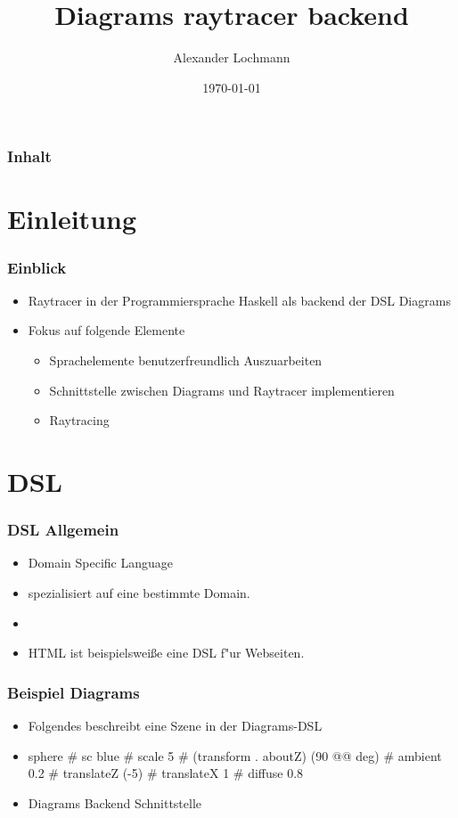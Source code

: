 \documentclass[12pt,german]{beamer}
\title{Diagrams raytracer backend}
\author{Alexander Lochmann}
\date{\today}
\begin{document}
\begin{frame}
\titlepage
\end{frame}

\begin{frame}
\frametitle{Inhalt}
\setcounter{tocdepth}{1}
\tableofcontents
\end{frame}

\section{Einleitung}

\begin{frame}
\frametitle{Einblick}
	\begin{itemize}
		\item Raytracer in der Programmiersprache Haskell
		      als backend der DSL Diagrams
		\pause
		\item Fokus auf folgende Elemente
                \begin{itemize}
                      \item Sprachelemente benutzerfreundlich Auszuarbeiten
                      \item Schnittstelle zwischen Diagrams und Raytracer implementieren
                      \item Raytracing 
                \end{itemize}
	\end{itemize}
\end{frame}

\section{DSL}

\begin{frame}
\frametitle{DSL Allgemein}
	\begin{itemize}
		\item Domain Specific Language
		\item spezialisiert auf eine bestimmte Domain.
		\pause
		\item 
		\item HTML ist beispielswei{\ss}e eine DSL f"ur Webseiten.
	\end{itemize}
\end{frame}

\begin{frame}
\frametitle{Beispiel Diagrams}
	\pause
	\begin{itemize}
		\item Folgendes beschreibt eine Szene in der Diagrams-DSL
		\pause
		\item sphere \# sc blue \# scale 5 \# (transform . aboutZ) (90 @@ deg) 
                      \# ambient 0.2 \# translateZ (-5) \# translateX 1 \# diffuse 0.8
                \item Diagrams Backend Schnittstelle
        \end{itemize}
\end{frame}
\end{document}
